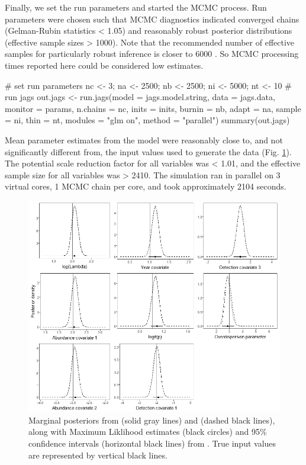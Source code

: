 \documentclass[article]{jss}
\begin{document}
Finally, we set the run parameters and started the MCMC process. Run parameters were chosen such that MCMC diagnostics indicated converged chains (Gelman-Rubin statistics < 1.05) and reasonably robust posterior distributions (effective sample sizes > 1000).  Note that the recommended number of effective samples for particularly robust inference is closer to 6000 \citep{Gong_Flegal_2016}.  So MCMC processing times reported here could be considered low estimates.

\begin{Code}
# set run parameters
nc <- 3; na <- 2500; nb <- 2500; ni <- 5000; nt <- 10
# run jags
out.jags <- run.jags(model = jags.model.string, data = jags.data,
                     monitor = params, n.chains = nc, inits = inits,
                     burnin = nb, adapt = na, sample = ni, thin = nt,
                     modules = "glm on", method = "parallel")
summary(out.jags)
\end{Code}

Mean parameter estimates from the  model were reasonably close to, and not significantly different from, the input values used to generate the data (Fig. \ref{fig:fig1}).  The potential scale reduction factor for all variables was < 1.01, and the effective sample size for all variables was > 2410.  The simulation ran in parallel on 3 virtual cores, 1 MCMC chain per core, and took approximately 2104 seconds.

\begin{figure}
  \includegraphics[width=\linewidth]{fig1.jpeg}
  \caption{Marginal posteriors from  (solid gray lines) and  (dashed black lines), along with Maximum Liklihood estimates (black circles) and 95\% confidence intervals (horizontal black lines) from .  True input values are represented by vertical black lines.}
  \label{fig:fig1}
\end{figure}
\end{document}
